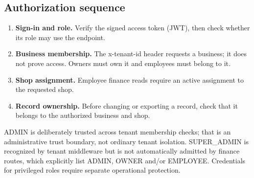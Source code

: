 \documentclass[10pt,a4paper]{article}
\begin{document}
\subsection*{Authorization sequence}

\begin{enumerate}
\item \textbf{Sign-in and role.} Verify the signed access token (JWT), then check whether its role may use the endpoint.
\item \textbf{Business membership.} The x-tenant-id header requests a business; it does not prove access. Owners must own it and employees must belong to it.
\item \textbf{Shop assignment.} Employee finance reads require an active assignment to the requested shop.
\item \textbf{Record ownership.} Before changing or exporting a record, check that it belongs to the authorized business and shop.
\end{enumerate}


ADMIN is deliberately trusted across tenant membership checks; that is an administrative trust boundary, not ordinary tenant isolation. SUPER\_ADMIN is recognized by tenant middleware but is not automatically admitted by finance routes, which explicitly list ADMIN, OWNER and/or EMPLOYEE. Credentials for privileged roles require separate operational protection.




\clearpage

\end{document}
